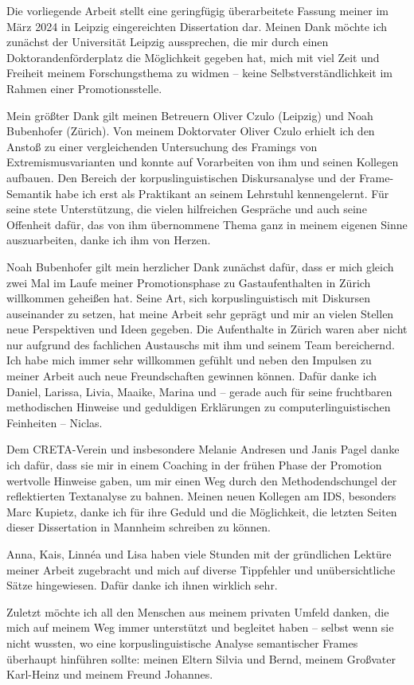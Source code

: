 \addchap{\lsAcknowledgementTitle} 

Die vorliegende Arbeit stellt eine geringfügig überarbeitete Fassung meiner im März 2024 in Leipzig eingereichten Dissertation dar. Meinen Dank möchte ich zunächst der Universität Leipzig aussprechen, die mir durch einen Doktorandenförderplatz die Möglichkeit gegeben hat, mich mit viel Zeit und Freiheit meinem Forschungsthema zu widmen – keine Selbstverständlichkeit im Rahmen einer Promotionsstelle.

Mein größter Dank gilt meinen Betreuern Oliver Czulo (Leipzig) und Noah Bubenhofer (Zürich). Von meinem Doktorvater Oliver Czulo erhielt ich den Anstoß zu einer vergleichenden Untersuchung des Framings von Extremismusvarianten und konnte auf Vorarbeiten von ihm und seinen Kollegen aufbauen. Den Bereich der korpuslinguistischen Diskursanalyse und der Frame-Semantik habe ich erst als Praktikant an seinem Lehrstuhl kennengelernt. Für seine stete Unterstützung, die vielen hilfreichen Gespräche und auch seine Offenheit dafür, das von ihm übernommene Thema ganz in meinem eigenen Sinne auszuarbeiten, danke ich ihm von Herzen.

Noah Bubenhofer gilt mein herzlicher Dank zunächst dafür, dass er mich gleich zwei Mal im Laufe meiner Promotionsphase zu Gastaufenthalten in Zürich willkommen geheißen hat. Seine Art, sich korpuslinguistisch mit Diskursen auseinander zu setzen, hat meine Arbeit sehr geprägt und mir an vielen Stellen neue Perspektiven und Ideen gegeben. Die Aufenthalte in Zürich waren aber nicht nur aufgrund des fachlichen Austauschs mit ihm und seinem Team bereichernd. Ich habe mich immer sehr willkommen gefühlt und neben den Impulsen zu meiner Arbeit auch neue Freundschaften gewinnen können. Dafür danke ich Daniel, Larissa, Livia, Maaike, Marina und – gerade auch für seine fruchtbaren methodischen Hinweise und geduldigen Erklärungen zu computerlinguistischen Feinheiten – Niclas.

Dem CRETA-Verein und insbesondere Melanie Andresen und Janis Pagel danke ich dafür, dass sie mir in einem Coaching in der frühen Phase der Promotion wertvolle Hinweise gaben, um mir einen Weg durch den Methodendschungel der reflektierten Textanalyse zu bahnen. Meinen neuen Kollegen am IDS, besonders Marc Kupietz, danke ich für ihre Geduld und die Möglichkeit, die letzten Seiten dieser Dissertation in Mannheim schreiben zu können.

Anna, Kais, Linnéa und Lisa haben viele Stunden mit der gründlichen Lektüre meiner Arbeit zugebracht und mich auf diverse Tippfehler und unübersichtliche Sätze hingewiesen. Dafür danke ich ihnen wirklich sehr.

Zuletzt möchte ich all den Menschen aus meinem privaten Umfeld danken, die mich auf meinem Weg immer unterstützt und begleitet haben – selbst wenn sie nicht wussten, wo eine korpuslinguistische Analyse semantischer Frames überhaupt hinführen sollte: meinen Eltern Silvia und Bernd, meinem Großvater Karl-Heinz und meinem Freund Johannes.
